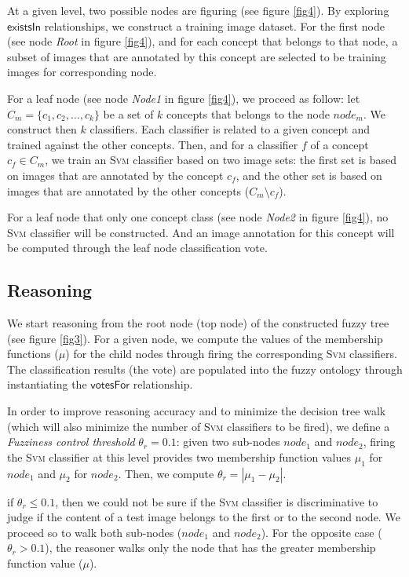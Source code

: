 At a given level, two possible nodes are figuring (see figure \ref{fig4}). By exploring $\mathsf{existsIn}$ relationships, we construct a training image dataset. For the first node (see node \emph{Root} in figure \ref{fig4}), and for each concept that belongs to that node, a subset of images that are annotated by this concept are selected to be training images for corresponding node.

For a leaf node (see node \emph{Node1} in figure \ref{fig4}), we proceed as follow: let $C_{m} = \{ c_{1}, c_{2}, \dots, c_{k}\}$ be a set of $k$ concepts that belongs to the node $node_{m}$. We construct then $k$ classifiers. Each classifier is related to a given concept and trained against the other concepts. Then, and for a classifier $f$ of a concept $c_{f} \in C_{m}$, we train an \textsc{Svm} classifier based on two image sets: the first set is based on images that are annotated by the concept $c_{f}$, and the other set is based on images that are annotated by the other concepts ($C_{m} \setminus c_{f}$).

For a leaf node that  only one concept class (see node \emph{Node2} in figure \ref{fig4}), no \textsc{Svm} classifier will be constructed. And an image annotation for this concept will be computed through the leaf node classification vote.

		\subsection{Reasoning}

We start reasoning from the root node (top node) of the constructed fuzzy tree (see figure \ref{fig3}). For a given node, we compute the values of the membership functions ($\mu$) for the child nodes through firing the corresponding \textsc{Svm} classifiers. The classification results (the vote) are populated into the fuzzy ontology through instantiating the $\mathsf{votesFor}$ relationship.

In order to improve reasoning accuracy and to minimize the decision tree walk (which will also minimize the number of \textsc{Svm} classifiers to be fired), we define a \textit{Fuzziness control threshold} $\theta_{r} = 0.1$: given two sub-nodes $node_{1}$ 
and $node_{2}$, firing the \textsc{Svm} classifier at this level provides two membership function values $\mu_{1}$ for $node_{1}$ and  $\mu_{2}$ for $node_{2}$. Then, we compute $\theta_{r} = | \mu_{1} - \mu_{2} |$.

if $\theta_{r} \leq 0.1$, then we could not be sure if the \textsc{Svm} classifier is discriminative to judge if the content of a test image belongs to the first or to the second node. We proceed so to walk both sub-nodes ($node_{1}$ and $node_{2}$). For the opposite case ($\theta_{r} > 0.1$), the reasoner walks only the node that has the greater membership function value ($\mu$). 

